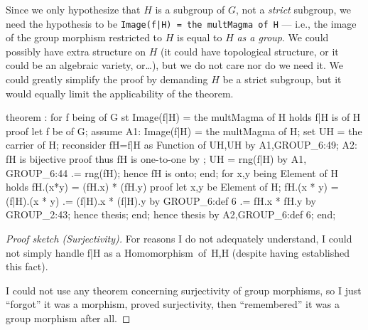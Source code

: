 \begin{thm-remark}
Since we only hypothesize that $H$ is a subgroup of $G$, not a
\emph{strict} subgroup, we need the hypothesis to be
\lstinline{Image(f|H) = the multMagma of H} --- i.e., the image of the
group morphism restricted to $H$ is equal to $H$ \emph{as a group}. We
could possibly have extra structure on $H$ (it could have topological
structure, or it could be an algebraic variety, or\dots), but we do not
care nor do we need it. We could greatly simplify the proof by demanding
$H$ be a strict subgroup, but it would equally limit the applicability
of the theorem.
\end{thm-remark}

\nwenddocs{}\endmoddef\nwstartdeflinemarkup{}\nwenddeflinemarkup
theorem :
  for f being  of G
  st Image(f|H) = the multMagma of H
  holds f|H is  of H
proof
  let f be  of G;
  assume A1: Image(f|H) = the multMagma of H;
  set UH = the carrier of H;
  reconsider fH=f|H as Function of UH,UH by A1,GROUP_6:49;
  A2: fH is bijective
  proof
    thus fH is one-to-one by ;
    UH = rng(f|H) by A1, GROUP_6:44
      .= rng(fH);
    hence fH is onto;
  end;
  for x,y being Element of H holds fH.(x*y) = (fH.x) * (fH.y)
  proof
    let x,y be Element of H;
    fH.(x * y) = (f|H).(x * y)
              .= (f|H).x * (f|H).y by GROUP_6:def 6
              .= fH.x * fH.y by GROUP_2:43;
    hence thesis;
  end;
  hence thesis by A2,GROUP_6:def 6;
end;
\eatline
{}\nwendcode{}\nwdocspar
\begin{proof}[Proof sketch (Surjectivity)]
For reasons I do not adequately understand, I could not simply handle
{\Tt{}f|H\nwendquote} as a {\Tt{}Homomorphism\ of\ H,H\nwendquote} (despite having established this
fact).

I could not use any theorem concerning surjectivity of group morphisms,
so I just ``forgot'' it was a morphism, proved surjectivity, then
``remembered'' it was a group morphism after all.
\end{proof}

